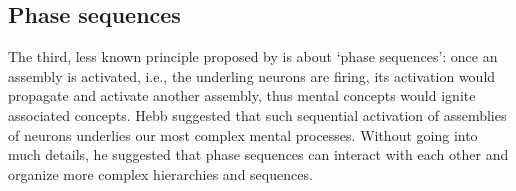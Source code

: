 
  





 

  \subsection{Phase sequences}
    The third, less known principle proposed by \cite{Hebb49} is about `phase
    sequences': once an assembly is activated, i.e., the underling neurons are
    firing, its activation would propagate and activate another assembly, thus
    mental concepts would ignite associated concepts. Hebb suggested that such
    sequential activation of assemblies of neurons underlies our most complex
    mental processes. Without going into much details, he suggested that phase
    sequences can interact with each other and organize more complex
    hierarchies and sequences. 

